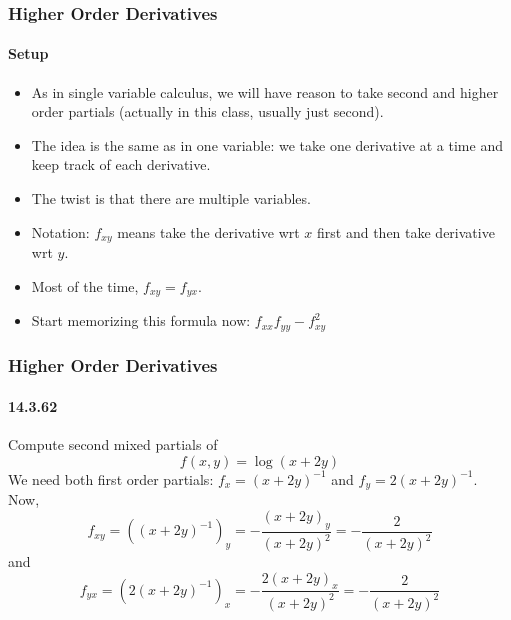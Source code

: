 \documentclass[xcolor=svgnames]{beamer}
\begin{document}
\begin{frame}
\frametitle{Higher Order Derivatives}
\framesubtitle{Setup}
\begin{itemize}
\item As in single variable calculus, we will have reason to take second and higher order partials (actually in this class, usually just second).
\item The idea is the same as in one variable: we take one derivative at a time and keep track of each derivative. 
\item The twist is that there are multiple variables.
\item Notation: $f_{xy}$ means take the derivative wrt $x$ first and then take derivative wrt $y$. 
\item Most of the time, $f_{xy} = f_{yx}$. 
\item Start memorizing this formula now: $f_{xx} f_{yy} - f_{xy}^2$
\end{itemize}
\end{frame}
\begin{frame}
\frametitle{Higher Order Derivatives}
\framesubtitle{14.3.62}
Compute second mixed partials of 
\[
	f(x,y) = \log (x + 2y)
\]
We need both first order partials: $f_x = (x+2y)^{-1}$ and $f_y = 2(x+2y)^{-1}$. Now,
\[
	f_{xy} = \left((x+2y)^{-1}\right)_y = -\frac{(x+2y)_y}{(x+2y)^2} = - \frac{2}{(x+2y)^2}
\]
and
\[
	f_{yx} =\left( 2(x+2y)^{-1} \right) _x =  -\frac{2(x+2y)_x}{(x+2y)^2} = - \frac{2}{(x+2y)^2}
\]
\end{frame}
\end{document}
